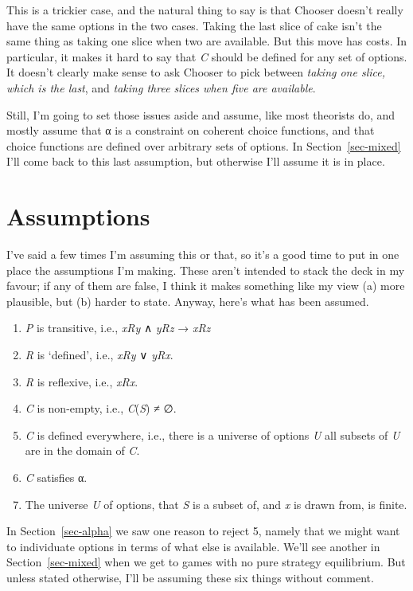 \documentclass[
  11pt,
  letterpaper,
  DIV=11,
  numbers=noendperiod,
  twoside]{scrartcl}
\providecommand{\tightlist}{%
  \setlength{\itemsep}{0pt}\setlength{\parskip}{0pt}}
\begin{document}
This is a trickier case, and the natural thing to say is that Chooser
doesn't really have the same options in the two cases. Taking the last
slice of cake isn't the same thing as taking one slice when two are
available. But this move has costs. In particular, it makes it hard to
say that \emph{C} should be defined for any set of options. It doesn't
clearly make sense to ask Chooser to pick between \emph{taking one
slice, which is the last}, and \emph{taking three slices when five are
available}.

Still, I'm going to set those issues aside and assume, like most
theorists do, and mostly assume that α is a constraint on coherent
choice functions, and that choice functions are defined over arbitrary
sets of options. In Section~\ref{sec-mixed} I'll come back to this last
assumption, but otherwise I'll assume it is in place.

\section{Assumptions}\label{sec-assumptions}

I've said a few times I'm assuming this or that, so it's a good time to
put in one place the assumptions I'm making. These aren't intended to
stack the deck in my favour; if any of them are false, I think it makes
something like my view (a) more plausible, but (b) harder to state.
Anyway, here's what has been assumed.

\begin{enumerate}
\def\labelenumi{\arabic{enumi}.}
\tightlist
\item
  \emph{P} is transitive, i.e., \emph{xRy} ∧ \emph{yRz} → \emph{xRz}
\item
  \emph{R} is `defined', i.e., \emph{xRy} ∨ \emph{yRx}.
\item
  \emph{R} is reflexive, i.e., \emph{xRx}.
\item
  \emph{C} is non-empty, i.e., \emph{C}(\emph{S}) ≠ ∅.
\item
  \emph{C} is defined everywhere, i.e., there is a universe of options
  \emph{U} all subsets of \emph{U} are in the domain of \emph{C}.
\item
  \emph{C} satisfies α.
\item
  The universe \emph{U} of options, that \emph{S} is a subset of, and
  \emph{x} is drawn from, is finite.
\end{enumerate}

In Section~\ref{sec-alpha} we saw one reason to reject 5, namely that we
might want to individuate options in terms of what else is available.
We'll see another in Section~\ref{sec-mixed} when we get to games with
no pure strategy equilibrium. But unless stated otherwise, I'll be
assuming these six things without comment.
\end{document}
